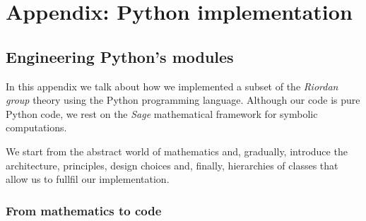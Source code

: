\chapter{Appendix: Python implementation}
\label{ch:appendix:python:implementation}

\section{Engineering Python's modules}

In this appendix we talk about how we implemented a subset of the \emph{Riordan
group} theory using the Python programming language.  Although our code is pure
Python code, we rest on the \emph{Sage} \cite{sage} mathematical framework for
symbolic computations.

We start from the abstract world of mathematics and, gradually, introduce the
architecture, principles, design choices and, finally, hierarchies of classes
that allow us to fullfil our implementation.

\subsection{From mathematics to code}
\label{subsection:python:appendix:from:math:to:code}

